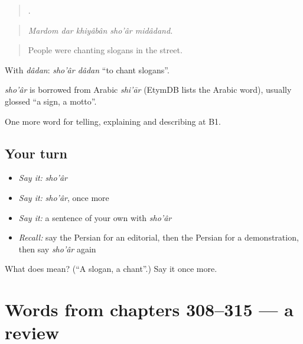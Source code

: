 \begin{quote}
    .
\end{quote}

\begin{quote}
\emph{Mardom dar khiyâbân sho'âr midâdand.}
\end{quote}

\begin{quote}
People were chanting slogans in the street.
\end{quote}

With \emph{dâdan}: \emph{sho'âr dâdan} \textquotedblleft{}to chant slogans\textquotedblright{}.

\begin{cousinweb}
\emph{sho'âr} is borrowed from Arabic \emph{shi'ār} (EtymDB lists the Arabic word), usually glossed \textquotedblleft{}a sign, a motto\textquotedblright{}.
\end{cousinweb}

\begin{grammarlens}[title={What you've built}]
One more word for telling, explaining and describing at B1.
\end{grammarlens}

\subsection*{Your turn}
\begin{itemize}
\raggedright
  \item \emph{Say it:} \emph{sho'âr}
  \item \emph{Say it:} \emph{sho'âr}, once more
  \item \emph{Say it:} a sentence of your own with \emph{sho'âr}
  \item \emph{Recall:} say the Persian for an editorial, then the Persian for a demonstration, then say \emph{sho'âr} again
\end{itemize}

\begin{tcolorbox}[breakable,colback=teal!4,colframe=teal!35!black,title={Before you move on}]
What does  mean? (\textquotedblleft{}A slogan, a chant\textquotedblright{}.) Say it once more.
\end{tcolorbox}
\section[(dialogue)]{Words from chapters 308–315 — a review}

